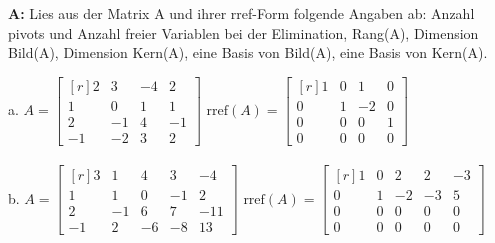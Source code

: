\documentclass[landscape,twocolumn,a4paper]{article}
\begin{document}
\textbf{A:}   
Lies aus der Matrix A und ihrer rref-Form folgende Angaben ab: Anzahl pivots und Anzahl freier Variablen bei der Elimination, 
Rang(A), Dimension  Bild(A), Dimension Kern(A), eine Basis von Bild(A), eine Basis von Kern(A).

a.   $A =\begin{bmatrix*}[r] 2 & 3 & -4 & 2\\  1 & 0 & 1 & 1\\ 2 & -1 & 4 & -1\\ -1 & -2 & 3 & 2\end{bmatrix*}$  \quad 
      $\text{rref}(A) =\begin{bmatrix*}[r] 1 & 0 & 1 & 0\\  0 & 1 & -2 & 0\\ 0 & 0 & 0 & 1\\ 0 & 0 & 0 & 0\end{bmatrix*}$ 
\\  
\.
\\   
b.   $A =\begin{bmatrix*}[r] 3 & 1 & 4 & 3 & -4\\  1 & 1 & 0 & -1 & 2\\ 2 & -1 & 6 & 7 & -11\\ -1 & 2 & -6 & -8 & 13\end{bmatrix*}$  \quad 
      $\text{rref}(A) =\begin{bmatrix*}[r] 1 & 0 & 2 & 2 & -3\\  0 & 1 & -2 & -3 & 5\\ 0 & 0 & 0 & 0 & 0\\ 0 & 0 & 0 & 0 & 0\end{bmatrix*}$ 
\bigskip {}
\end{document}
